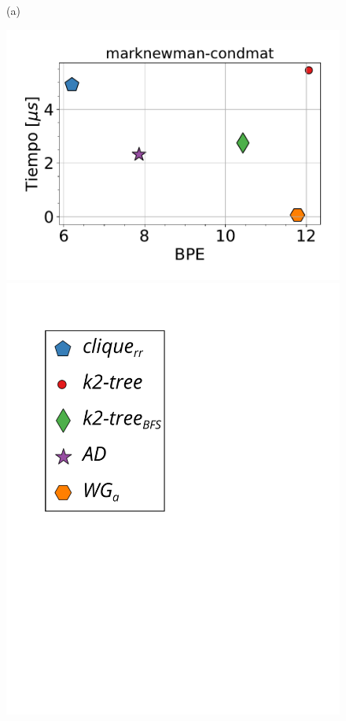 \begin{figure}
\begin{minipage}{1\textwidth}
\begin{minipage}{0.45\textwidth}
    			(a)
    		\end{minipage}
    		\begin{minipage}{0.45\textwidth}
    			\centering
    			\begin{minipage}{0.75\textwidth}
    				\centering
    				\includegraphics[width=1\linewidth]{img/bpeTimes/aleatorio/marknewman-condmat.pdf}
    			\end{minipage}
    			\begin{minipage}{0.2\textwidth}
    				\centering
    				\includegraphics[scale=.2, clip, trim=60 194 0 0]{img/bpeTimes/labelAle.pdf}
    			\end{minipage}
    			

\end{minipage}
\end{minipage}
\end{figure}

